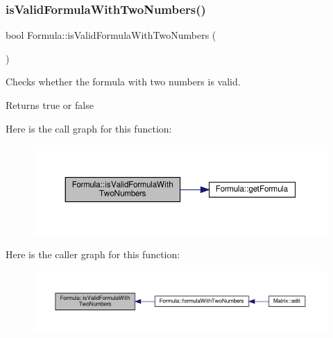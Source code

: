 \subsubsection{\texorpdfstring{is\+Valid\+Formula\+With\+Two\+Numbers()}{isValidFormulaWithTwoNumbers()}}
{\footnotesize\ttfamily bool Formula\+::is\+Valid\+Formula\+With\+Two\+Numbers (\begin{DoxyParamCaption}{ }\end{DoxyParamCaption})\hspace{0.3cm}{\ttfamily [private]}}

Checks whether the formula with two numbers is valid. \begin{DoxyReturn}{Returns}
true or false 
\end{DoxyReturn}
Here is the call graph for this function\+:\nopagebreak
\begin{figure}[H]
\begin{center}
\leavevmode
\includegraphics[width=350pt]{class_formula_a0a2b13b0f741ea650e1ae71269dde9a5_cgraph}
\end{center}
\end{figure}
Here is the caller graph for this function\+:\nopagebreak
\begin{figure}[H]
\begin{center}
\leavevmode
\includegraphics[width=350pt]{class_formula_a0a2b13b0f741ea650e1ae71269dde9a5_icgraph}
\end{center}
\end{figure}
\mbox{\label{class_formula_a9a27ccdd3ee3143b1f6e541ec3c6a0ec}} 
